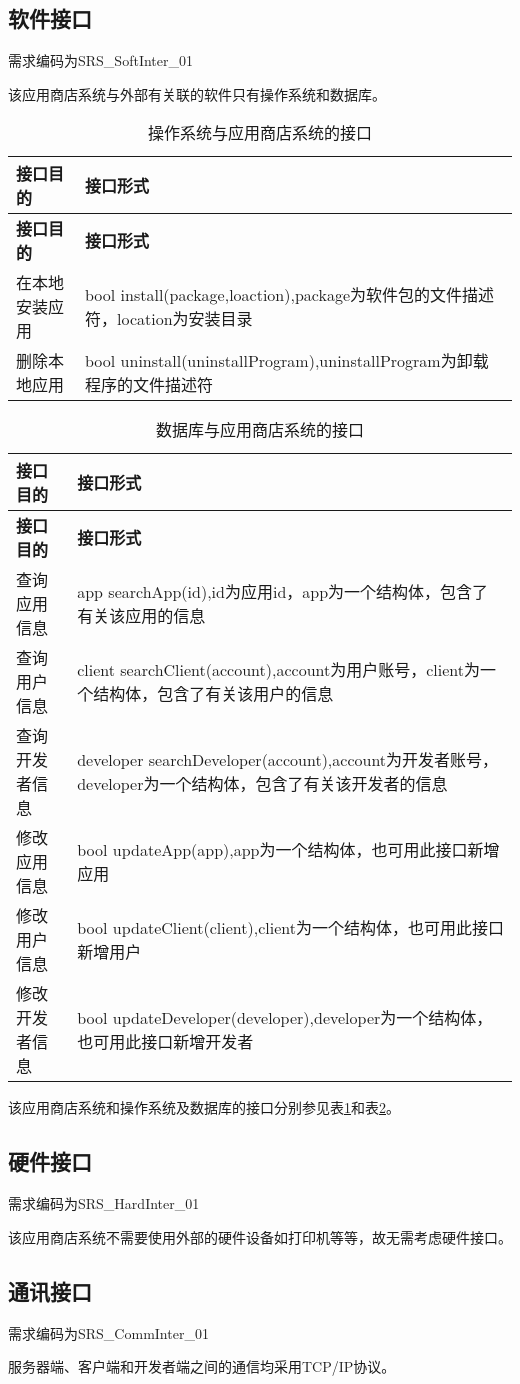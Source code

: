 \subsection{软件接口}

需求编码为SRS\_SoftInter\_01

该应用商店系统与外部有关联的软件只有操作系统和数据库。
\begin{longtable}{|p{4cm}|p{10cm}|}
\caption{操作系统与应用商店系统的接口}\label{tab:os_interface} \\
\hline
\textbf{接口目的} & \textbf{接口形式}\\
\hline
\endfirsthead
\hline
\textbf{接口目的} & \textbf{接口形式}\\
\hline
\endhead
\hline 
\endfoot
\hline
\endlastfoot
在本地安装应用 & bool install(package,loaction),package为软件包的文件描述符，location为安装目录\\
删除本地应用 & bool uninstall(uninstallProgram),uninstallProgram为卸载程序的文件描述符\\
\end{longtable}

\begin{longtable}{|p{4cm}|p{10cm}|}
	\caption{数据库与应用商店系统的接口}\label{tab:db_interface} \\
	\hline
	\textbf{接口目的} & \textbf{接口形式}\\
	\hline
	\endfirsthead
	\hline
	\textbf{接口目的} & \textbf{接口形式}\\
	\hline
	\endhead
	\hline 
	\endfoot
	\hline
	\endlastfoot
	查询应用信息 & app searchApp(id),id为应用id，app为一个结构体，包含了有关该应用的信息\\
	查询用户信息 & client searchClient(account),account为用户账号，client为一个结构体，包含了有关该用户的信息\\
	查询开发者信息 & developer searchDeveloper(account),account为开发者账号，developer为一个结构体，包含了有关该开发者的信息\\
	修改应用信息 & bool updateApp(app),app为一个结构体，也可用此接口新增应用\\
	修改用户信息 & bool updateClient(client),client为一个结构体，也可用此接口新增用户\\
	修改开发者信息 & bool updateDeveloper(developer),developer为一个结构体，也可用此接口新增开发者\\
	\end{longtable}
该应用商店系统和操作系统及数据库的接口分别参见表\ref{tab:os_interface}和表\ref{tab:db_interface}。

\subsection{硬件接口}

需求编码为SRS\_HardInter\_01

该应用商店系统不需要使用外部的硬件设备如打印机等等，故无需考虑硬件接口。

\subsection{通讯接口}

需求编码为SRS\_CommInter\_01

服务器端、客户端和开发者端之间的通信均采用TCP/IP协议。
